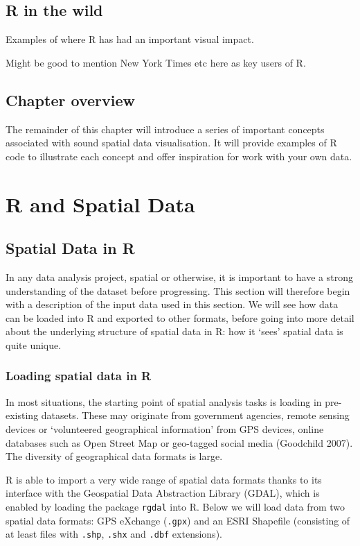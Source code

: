 \documentclass[]{article}
\begin{document}
\subsection{R in the wild}

Examples of where R has had an important visual impact.

Might be good to mention New York Times etc here as key users of R.

\subsection{Chapter overview}

The remainder of this chapter will introduce a series of important
concepts associated with sound spatial data visualisation. It will
provide examples of R code to illustrate each concept and offer
inspiration for work with your own data.

\section{R and Spatial Data}

\subsection{Spatial Data in R}

In any data analysis project, spatial or otherwise, it is important to
have a strong understanding of the dataset before progressing. This
section will therefore begin with a description of the input data used
in this section. We will see how data can be loaded into R and exported
to other formats, before going into more detail about the underlying
structure of spatial data in R: how it `sees' spatial data is quite
unique.

\subsubsection{Loading spatial data in R}

In most situations, the starting point of spatial analysis tasks is
loading in pre-existing datasets. These may originate from government
agencies, remote sensing devices or `volunteered geographical
information' from GPS devices, online databases such as Open Street Map
or geo-tagged social media (Goodchild 2007). The diversity of
geographical data formats is large.

R is able to import a very wide range of spatial data formats thanks to
its interface with the Geospatial Data Abstraction Library (GDAL), which
is enabled by loading the package \texttt{rgdal} into R. Below we will
load data from two spatial data formats: GPS eXchange (\texttt{.gpx})
and an ESRI Shapefile (consisting of at least files with \texttt{.shp},
\texttt{.shx} and \texttt{.dbf} extensions).
\end{document}

